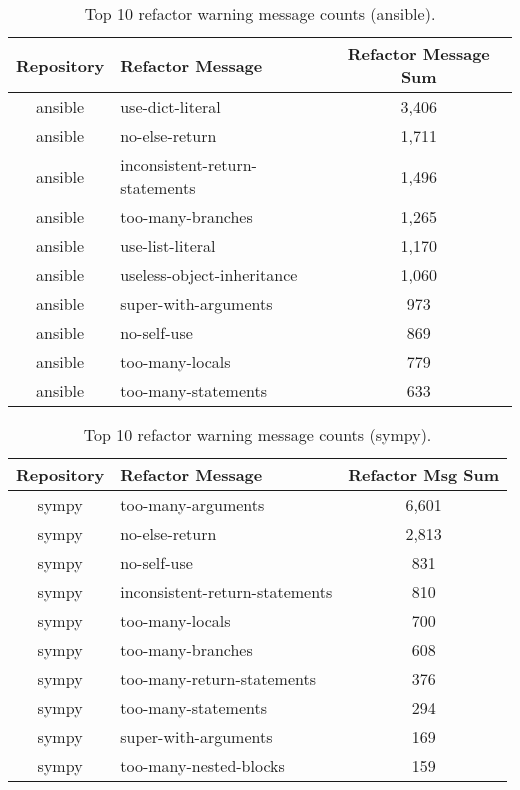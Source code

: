 \begin{table}[ht]
  \centering
  \begin{tabularx}{1.0\textwidth} {
    | c
    | >{\centering\arraybackslash}X 
    | c |
  }
    \hline
      Repository & Refactor Message & Refactor Message Sum \\
    \hline\hline
      ansible & use-dict-literal & 3,406 \\
      ansible & no-else-return & 1,711 \\
      ansible & inconsistent-return-statements & 1,496 \\
      ansible & too-many-branches & 1,265 \\
      ansible & use-list-literal & 1,170 \\
      ansible & useless-object-inheritance & 1,060 \\
      ansible & super-with-arguments & 973 \\
      ansible & no-self-use & 869 \\
      ansible & too-many-locals & 779 \\
      ansible & too-many-statements & 633 \\
    \hline
  \end{tabularx}
  \caption{Top 10 refactor warning message counts (ansible).}
  \label{table:refactorMessagesAnsible}
\end{table}

\begin{table}[ht]
  \centering
  \begin{tabularx}{1.0\textwidth} {
    | c
    | >{\centering\arraybackslash}X 
    | c |
  }
    \hline
      Repository & Refactor Message & Refactor Msg Sum \\
    \hline\hline
      sympy & too-many-arguments & 6,601 \\
      sympy & no-else-return & 2,813 \\
      sympy & no-self-use & 831 \\
      sympy & inconsistent-return-statements & 810 \\
      sympy & too-many-locals & 700 \\
      sympy & too-many-branches & 608 \\
      sympy & too-many-return-statements & 376 \\
      sympy & too-many-statements & 294 \\
      sympy & super-with-arguments & 169 \\
      sympy & too-many-nested-blocks & 159 \\
    \hline
  \end{tabularx}
  \caption{Top 10 refactor warning message counts (sympy).}
  \label{table:refactorMessagesSymPy}
\end{table}

